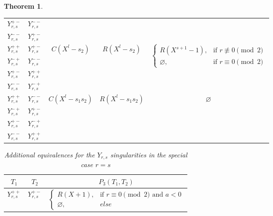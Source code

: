 \documentclass[noend]{amsproc}
\newtheorem{theorem}{Theorem}
\theoremstyle{definition}
\begin{document}
\begin{theorem}
\begin{table}[htb]
\begin{tabular}{|c|c||c|c|c|}
$Y_{r,s}^{+-}$ & $Y_{r,s}^{--}$ &&&
\\ \cline{1-2}

$Y_{r,s}^{--}$ & $Y_{r,s}^{+-}$ &&&
\\ \hline


$Y_{r,s}^{++}$ & $Y_{r,s}^{+-}$ &
\multirow{4}{*}{$C(X^l-s_2)$} &
\multirow{4}{*}{$R(X^l-s_2)$} &
\multirow{4}{*}{$\begin{cases}
  R(X^{s+1}-1), &\!\text{if } r \not\equiv 0 \pmod{2} \\
  \varnothing,  &\!\text{if } r \equiv 0 \pmod{2}
\end{cases}$}
\\ \cline{1-2}

$Y_{r,s}^{-+}$ & $Y_{r,s}^{--}$ &&&
\\ \cline{1-2}

$Y_{r,s}^{+-}$ & $Y_{r,s}^{++}$ &&&
\\ \cline{1-2}

$Y_{r,s}^{--}$ & $Y_{r,s}^{-+}$ &&&
\\ \hline


$Y_{r,s}^{++}$ & $Y_{r,s}^{--}$ &
\multirow{4}{*}{$C(X^l-s_1 s_2)$} &
\multirow{4}{*}{$R(X^l-s_1 s_2)$} &
\multirow{4}{*}{$\varnothing$}
\\ \cline{1-2}

$Y_{r,s}^{-+}$ & $Y_{r,s}^{+-}$ &&&
\\ \cline{1-2}

$Y_{r,s}^{+-}$ & $Y_{r,s}^{-+}$ &&&
\\ \cline{1-2}

$Y_{r,s}^{--}$ & $Y_{r,s}^{++}$ &&&
\\ \hline

\end{tabular}
\end{table}

\begin{table}[htb]
\centering
\caption{Additional equivalences for the $Y_{r,s}$ singularities in the
special case $r = s$}
\label{tab:Yrr_equivalences}
\begin{tabular}{|c|c||c|}
\hline

$T_1$ & $T_2$ & $P_3(T_1, T_2)$ \\
\hline\hline

$Y_{r,s}^{++}$ & $Y_{r,s}^{+-}$ &
\multirow{2}{*}{$\begin{cases}
  R(X+1),      &\!\text{if } r \equiv 0 \pmod{2} \text{ and } a < 0 \\
  \varnothing, &else
\end{cases}$}
\\ \cline{1-2}


\end{tabular}
\end{table}
\end{theorem}
\end{document}
